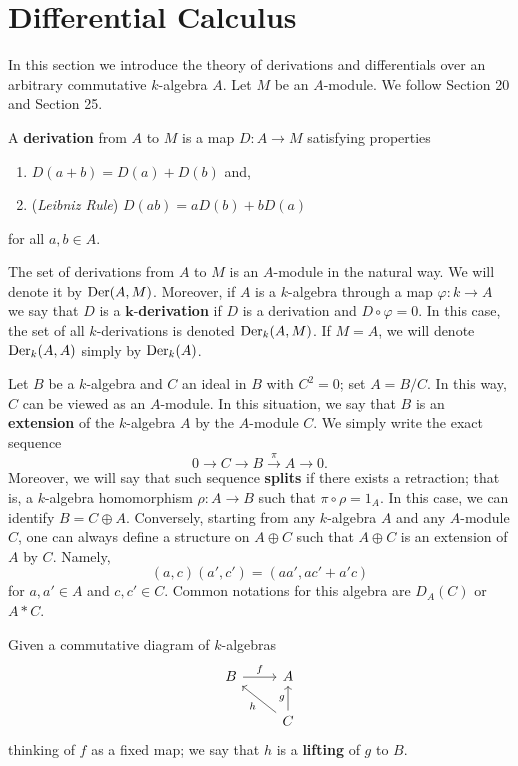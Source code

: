 \section{Differential Calculus}
In this section we introduce the theory of derivations and differentials over an arbitrary commutative $k$-algebra $A$. Let $M$ be an $A$-module. We follow \cite{EGA4} Section 20 and \cite{Matsumura} Section 25. 
\begin{definition}\label{def:derivations-and-differentials}
	A \textbf{derivation} from $A$ to $M$ is a map $D\colon A \to M$ satisfying properties
	\begin{enumerate}[label = (\roman*)]
			\item $D(a + b) = D(a) + D(b)$ and,
			\item (\textit{Leibniz Rule}) $D(ab) = aD(b) + bD(a)$ 
	\end{enumerate}
for all $a,b \in A$.

The set of derivations from $A$ to $M$ is an $A$-module in the natural way. We will denote it by $\operatorname{Der}(A,M)$. Moreover, if $A$ is a $k$-algebra through a map $\varphi\colon k \to A$ we say that $D$ is a $\mathbf{k}$-\textbf{derivation} if $D$ is a derivation and $D \circ \varphi = 0$. In this case, the set of all $k$-derivations is denoted $\operatorname{Der}_{k}(A,M)$. If $M = A$, we will denote $\operatorname{Der}_{k}(A,A)$ simply by $\operatorname{Der}_{k}(A)$.
\end{definition}
\begin{definition}\label{def:extension-of-algebras}
Let $B$ be a $k$-algebra and $C$ an ideal in $B$ with $C^{2} = 0$; set $A =B/C$. In this way, $C$ can be viewed as an $A$-module. In this situation, we say that $B$ is an \textbf{extension} of the $k$-algebra $A$ by the $A$-module $C$. We simply write the exact sequence
\[\label{eqn:extension}
	0 \to C \to B \xrightarrow{\pi} A \to 0.
\]
Moreover, we will say that such sequence \textbf{splits} if there exists a retraction; that is, a $k$-algebra homomorphism $\rho\colon A \to B$ such that $\pi \circ \rho = 1_{A}$. In this case, we can identify $B = C\oplus A$. Conversely, starting from any $k$-algebra $A$ and any $A$-module $C$, one can always define a structure on $A \oplus C$ such that $A\oplus C$ is an extension of $A$ by $C$. Namely, 
\[
			(a,c)(a',c') = (aa',ac' + a'c)
\]
for $a,a'\in A$ and $c,c' \in C$. Common notations for this algebra are $D_{A}(C)$ or $A * C$.		
\end{definition}
\begin{definition}\label{def:lifting}
Given a commutative diagram of $k$-algebras
\[
	\begin{tikzcd}
		 	B \arrow[r, "f"] & A \\
		 	& C\arrow[lu, "h"] \arrow[u, "g"]
	\end{tikzcd} 
\]
thinking of $f$ as a fixed map; we say that $h$ is a \textbf{lifting} of $g$ to $B$. 
\end{definition}
